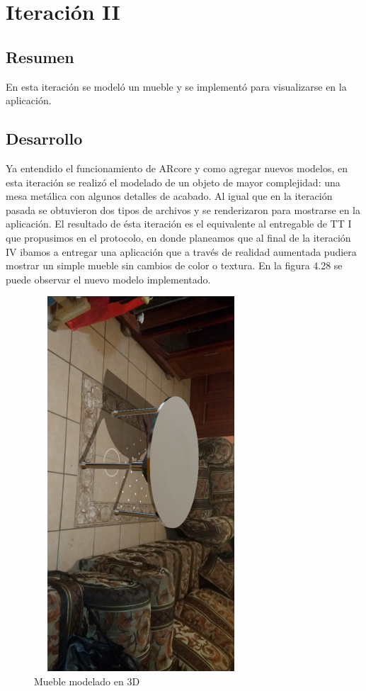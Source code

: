 \section{Iteración II}
\subsection{Resumen}
En esta iteración se modeló un mueble y se implementó para visualizarse en la aplicación.
\subsection{Desarrollo}
Ya entendido el funcionamiento de ARcore y como agregar nuevos modelos, en esta iteración se realizó el modelado de un objeto de mayor complejidad: una mesa metálica con algunos detalles de acabado. Al igual que en la iteración pasada se obtuvieron dos tipos de archivos y se renderizaron para mostrarse en la aplicación. El resultado de ésta iteración es el equivalente al entregable de TT I que propusimos en el protocolo, en donde planeamos que al final de la iteración IV ibamos a entregar una aplicación que a través de realidad aumentada pudiera mostrar un simple mueble sin cambios de color o textura.
En la figura 4.28 se puede observar el nuevo modelo implementado.
\begin{figure}[H]
	\centering
	\includegraphics[width=8cm,height=14cm,angle=90]{imagenes/iteraciones/AR3.png}
	\caption{Mueble modelado en 3D}
	\label{fig:analogo}
\end{figure} 
